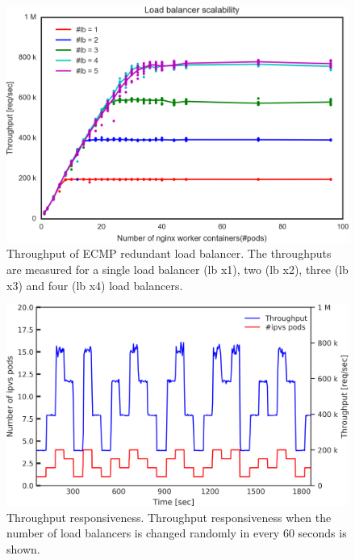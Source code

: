 \FloatBarrier

\begin{figure}[h]
  \centering
  \includegraphics[width=0.9\columnwidth]{Figs/ecmp_lb_cubic}
  \par\bigskip
  \centering
  \begin{minipage}{0.9\columnwidth}
    \caption[Throughput of ECMP redundant load balancer]{
      Throughput of ECMP redundant load balancer.
      The throughputs are measured for a single load balancer (lb x1), two (lb x2), three (lb x3) and four (lb x4) load balancers.
    }
    \label{fig:ecmp_lb_cubic}
  \end{minipage}
\end{figure}

\begin{figure}[h]
  \centering
  \includegraphics[width=0.9\columnwidth]{Figs/ecmp_response}
  \par\bigskip
  \centering
  \begin{minipage}{0.9\columnwidth}
    \caption[Throughput responsiveness]{
      Throughput responsiveness.
      Throughput responsiveness when the number of load balancers is changed randomly in every 60 seconds is shown.
    }
    \label{fig:ecmp_response}
  \end{minipage}
\end{figure}


